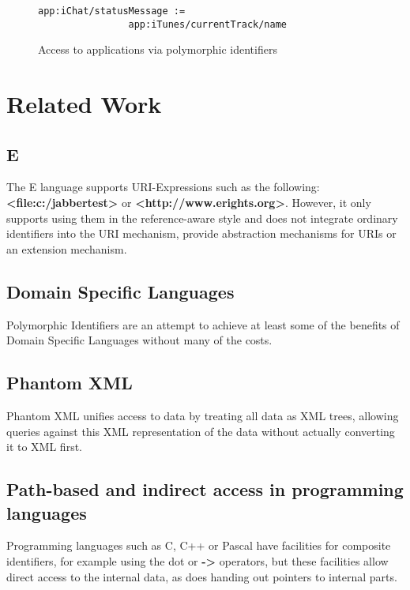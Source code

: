\documentclass[preprint,authoryear]{acm_proc_article-sp}
\begin{document}
\begin{figure}[htbp]
\begin{center}
\begin{verbatim}
app:iChat/statusMessage :=
                app:iTunes/currentTrack/name
\end{verbatim}
\caption{Access to applications via polymorphic identifiers}
\label{NonAppleScript}
\end{center}
\end{figure}


\section{Related Work}



\subsection{E}

The E language\cite{MillerRobustComposition}  supports URI-Expressions such as
the following:  {\bf <file:c:/jabbertest> } or {\bf <http://www.erights.org>}.  However,
it only supports using them in the reference-aware style and does not integrate 
ordinary identifiers into the URI mechanism, provide abstraction mechanisms
for URIs or an extension mechanism. 

\subsection{Domain Specific Languages}

Polymorphic Identifiers are an attempt to achieve at least some of the benefits
of Domain Specific Languages without many of the costs.  


\subsection{Phantom XML}

Phantom XML\cite{phantomxml} unifies access to data by treating all data as
XML trees, allowing queries against this XML representation of the data without
actually converting it to XML first.  


\subsection{Path-based and indirect access in programming languages}

Programming languages such as C, C++ or Pascal have facilities for composite
identifiers, for example using the dot or {\bf -> } operators, but these facilities allow
direct access to the internal data, as does handing out pointers to internal parts.
\end{document}
